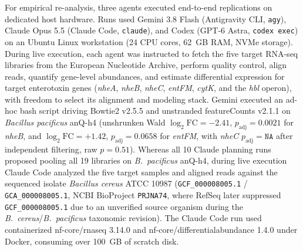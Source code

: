 \documentclass[11pt,letterpaper]{article}
\newcommand{\tool}[1]{\textsf{#1}}
\begin{document}
For empirical re-analysis, three agents executed end-to-end replications on dedicated host hardware. Runs used Gemini 3.8 Flash (Antigravity CLI, \texttt{agy}), Claude Opus 5.5 (Claude Code, \texttt{claude}), and Codex (GPT-6 Astra, \texttt{codex exec}) on an Ubuntu Linux workstation (24 CPU cores, 62~GB RAM, NVMe storage). During live execution, each agent was instructed to fetch the five target RNA-seq libraries from the European Nucleotide Archive, perform quality control, align reads, quantify gene-level abundances, and estimate differential expression for target enterotoxin genes (\textit{nheA}, \textit{nheB}, \textit{nheC}, \textit{entFM}, \textit{cytK}, and the \textit{hbl} operon), with freedom to select its alignment and modeling stack. Gemini executed an ad-hoc bash script driving \tool{Bowtie2} v2.5.5 and unstranded \tool{featureCounts} v2.1.1 on \textit{Bacillus pacificus} anQ-h4 (unshrunken Wald $\log_2\text{FC} = -2.41$, $p_{\text{adj}} = 0.0021$ for \textit{nheB}, and $\log_2\text{FC} = +1.42$, $p_{\text{adj}} = 0.0658$ for \textit{entFM}, with \textit{nheC} $p_{\text{adj}} = \texttt{NA}$ after independent filtering, raw $p = 0.51$). Whereas all 10 Claude planning runs proposed pooling all 19 libraries on \textit{B.\ pacificus} anQ-h4, during live execution Claude Code analyzed the five target samples and aligned reads against the sequenced isolate \textit{Bacillus cereus} ATCC 10987 (\texttt{GCF\_000008005.1} / \texttt{GCA\_000008005.1}, NCBI BioProject \texttt{PRJNA74}, where RefSeq later suppressed \texttt{GCF\_000008005.1} due to an unverified source organism during the \textit{B.\ cereus}/\textit{B.\ pacificus} taxonomic revision). The Claude Code run used containerized \tool{nf-core/rnaseq} 3.14.0 and \tool{nf-core/differentialabundance} 1.4.0 under Docker, consuming over 100~GB of scratch disk.
\end{document}
